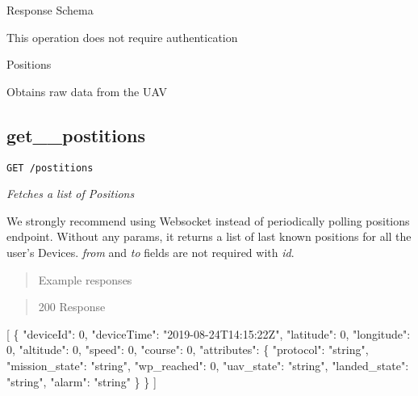 \documentclass[
]{article}
\newenvironment{Shaded}{}{}
\newcommand{\DataTypeTok}[1]{\textcolor[rgb]{0.56,0.13,0.00}{#1}}
\newcommand{\DecValTok}[1]{\textcolor[rgb]{0.25,0.63,0.44}{#1}}
\newcommand{\FunctionTok}[1]{\textcolor[rgb]{0.02,0.16,0.49}{#1}}
\newcommand{\OtherTok}[1]{\textcolor[rgb]{0.00,0.44,0.13}{#1}}
\newcommand{\StringTok}[1]{\textcolor[rgb]{0.25,0.44,0.63}{#1}}
\begin{document}
Response Schema

This operation does not require authentication

Positions

Obtains raw data from the UAV

\hypertarget{get__postitions}{%
\subsection{get\_\_postitions}\label{get__postitions}}

\texttt{GET\ /postitions}

\emph{Fetches a list of Positions}

We strongly recommend using Websocket instead of periodically polling
positions endpoint. Without any params, it returns a list of last known
positions for all the user's Devices. \emph{from} and \emph{to} fields
are not required with \emph{id}.

\begin{quote}
Example responses
\end{quote}

\begin{quote}
200 Response
\end{quote}

\begin{Shaded}
\begin{Highlighting}[]
\OtherTok{[}
  \FunctionTok{\{}
    \DataTypeTok{"deviceId"}\FunctionTok{:} \DecValTok{0}\FunctionTok{,}
    \DataTypeTok{"deviceTime"}\FunctionTok{:} \StringTok{"2019{-}08{-}24T14:15:22Z"}\FunctionTok{,}
    \DataTypeTok{"latitude"}\FunctionTok{:} \DecValTok{0}\FunctionTok{,}
    \DataTypeTok{"longitude"}\FunctionTok{:} \DecValTok{0}\FunctionTok{,}
    \DataTypeTok{"altitude"}\FunctionTok{:} \DecValTok{0}\FunctionTok{,}
    \DataTypeTok{"speed"}\FunctionTok{:} \DecValTok{0}\FunctionTok{,}
    \DataTypeTok{"course"}\FunctionTok{:} \DecValTok{0}\FunctionTok{,}
    \DataTypeTok{"attributes"}\FunctionTok{:} \FunctionTok{\{}
      \DataTypeTok{"protocol"}\FunctionTok{:} \StringTok{"string"}\FunctionTok{,}
      \DataTypeTok{"mission\_state"}\FunctionTok{:} \StringTok{"string"}\FunctionTok{,}
      \DataTypeTok{"wp\_reached"}\FunctionTok{:} \DecValTok{0}\FunctionTok{,}
      \DataTypeTok{"uav\_state"}\FunctionTok{:} \StringTok{"string"}\FunctionTok{,}
      \DataTypeTok{"landed\_state"}\FunctionTok{:} \StringTok{"string"}\FunctionTok{,}
      \DataTypeTok{"alarm"}\FunctionTok{:} \StringTok{"string"}
    \FunctionTok{\}}
  \FunctionTok{\}}
\OtherTok{]}
\end{Highlighting}
\end{Shaded}
\end{document}
